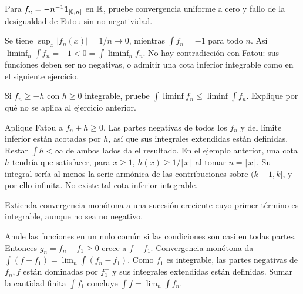 \begin{ejercicio}\label{ej:v2-l10-5}
Para $f_n=-n^{-1}\mathbf1_{[0,n]}$ en $\mathbb R$, pruebe convergencia uniforme a cero y fallo de la desigualdad de Fatou sin no negatividad.
\end{ejercicio}
\begin{solucion}
Se tiene $\sup_x|f_n(x)|=1/n\to0$, mientras $\int f_n=-1$ para todo $n$. Así $\liminf_n\int f_n=-1<0=\int\liminf_nf_n$. No hay contradicción con Fatou: sus funciones deben ser no negativas, o admitir una cota inferior integrable como en el siguiente ejercicio.
\end{solucion}

\begin{ejercicio}\label{ej:v2-l10-6}
Si $f_n\ge-h$ con $h\ge0$ integrable, pruebe $\int\liminf f_n\le\liminf\int f_n$. Explique por qué no se aplica al ejercicio anterior.
\end{ejercicio}
\begin{solucion}
Aplique Fatou a $f_n+h\ge0$. Las partes negativas de todos los $f_n$ y del límite inferior están acotadas por $h$, así que sus integrales extendidas están definidas. Restar $\int h<\infty$ de ambos lados da el resultado. En el ejemplo anterior, una cota $h$ tendría que satisfacer, para $x\ge1$, $h(x)\ge1/\lceil x\rceil$ al tomar $n=\lceil x\rceil$. Su integral sería al menos la serie armónica de las contribuciones sobre $(k-1,k]$, y por ello infinita. No existe tal cota inferior integrable.
\end{solucion}

\begin{ejercicio}\label{ej:v2-l10-7}
Extienda convergencia monótona a una sucesión creciente cuyo primer término es integrable, aunque no sea no negativo.
\end{ejercicio}
\begin{solucion}
Anule las funciones en un nulo común si las condiciones son casi en todas partes. Entonces $g_n=f_n-f_1\ge0$ crece a $f-f_1$. Convergencia monótona da $\int(f-f_1)=\lim_n\int(f_n-f_1)$. Como $f_1$ es integrable, las partes negativas de $f_n,f$ están dominadas por $f_1^-$ y sus integrales extendidas están definidas. Sumar la cantidad finita $\int f_1$ concluye $\int f=\lim_n\int f_n$.
\end{solucion}

